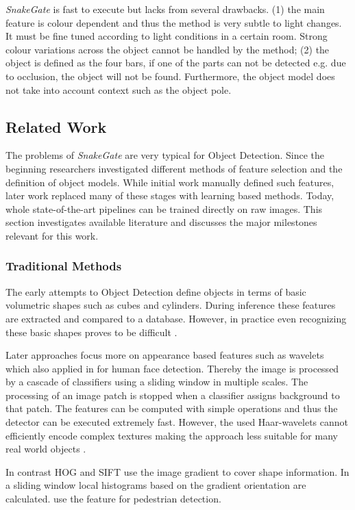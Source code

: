 \textit{SnakeGate} is fast to execute but lacks from several drawbacks. (1) the main feature is colour dependent and thus the method is very subtle to light changes. It must be fine tuned according to light conditions in a certain room. Strong colour variations across the object cannot be handled by the method; (2) the object is defined as the four bars, if one of the parts can not be detected e.g. due to occlusion, the object will not be found. Furthermore, the object model does not take into account context such as the object pole.

\subsection{Related Work}

The problems of \textit{SnakeGate} are very typical for Object Detection. Since the beginning researchers investigated different methods of feature selection and the definition of object models. While initial work manually defined such features, later work replaced many of these stages with learning based methods. Today, whole state-of-the-art pipelines can be trained directly on raw images. This section investigates available literature and discusses the major milestones relevant for this work.

\subsubsection{Traditional Methods}

The early attempts to Object Detection define objects in terms of basic volumetric shapes such as cubes and cylinders. During inference these features are extracted and compared to a database. However, in practice even recognizing these basic shapes proves to be difficult \cite{Andreopoulos2013}. 

Later approaches focus more on appearance based features such as wavelets \cite{Papageorgiou} which also applied in \cite{Viola2004} for human face detection. Thereby the image is processed by a cascade of classifiers using a sliding window in multiple scales. The processing of an image patch is stopped when a classifier assigns background to that patch. The features can be computed with simple operations and thus the detector can be executed extremely fast. However, the used Haar-wavelets cannot efficiently encode complex textures making the approach less suitable for many real world objects \cite{Andreopoulos2013}. 

In contrast \ac{HOG} \cite{Dalal} and \ac{SIFT} \cite{Lowe2004} use the image gradient to cover shape information. In a sliding window local histograms based on the gradient orientation are calculated. \citeauthor{Dalal} \cite{Dalal} use the feature for pedestrian detection.

